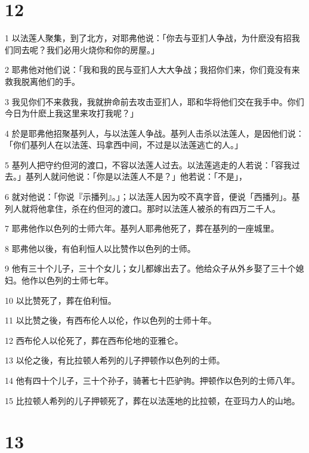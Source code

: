 \chapter{12}

\par 1 以法莲人聚集，到了北方，对耶弗他说：「你去与亚扪人争战，为什麽没有招我们同去呢？我们必用火烧你和你的房屋。」
\par 2 耶弗他对他们说：「我和我的民与亚扪人大大争战；我招你们来，你们竟没有来救我脱离他们的手。
\par 3 我见你们不来救我，我就拚命前去攻击亚扪人，耶和华将他们交在我手中。你们今日为什麽上我这里来攻打我呢？」
\par 4 於是耶弗他招聚基列人，与以法莲人争战。基列人击杀以法莲人，是因他们说：「你们基列人在以法莲、玛拿西中间，不过是以法莲逃亡的人。」
\par 5 基列人把守约但河的渡口，不容以法莲人过去。以法莲逃走的人若说：「容我过去。」基列人就问他说：「你是以法莲人不是？」他若说：「不是」，
\par 6 就对他说：「你说『示播列』。」；以法莲人因为咬不真字音，便说「西播列」。基列人就将他拿住，杀在约但河的渡口。那时以法莲人被杀的有四万二千人。
\par 7 耶弗他作以色列的士师六年。基列人耶弗他死了，葬在基列的一座城里。
\par 8 耶弗他以後，有伯利恒人以比赞作以色列的士师。
\par 9 他有三十个儿子，三十个女儿；女儿都嫁出去了。他给众子从外乡娶了三十个媳妇。他作以色列的士师七年。
\par 10 以比赞死了，葬在伯利恒。
\par 11 以比赞之後，有西布伦人以伦，作以色列的士师十年。
\par 12 西布伦人以伦死了，葬在西布伦地的亚雅仑。
\par 13 以伦之後，有比拉顿人希列的儿子押顿作以色列的士师。
\par 14 他有四十个儿子，三十个孙子，骑著七十匹驴驹。押顿作以色列的士师八年。
\par 15 比拉顿人希列的儿子押顿死了，葬在以法莲地的比拉顿，在亚玛力人的山地。

\chapter{13}

